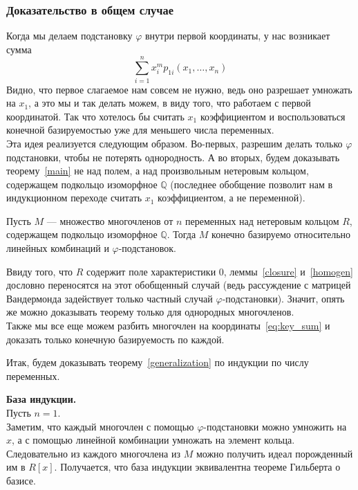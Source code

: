\subsubsection{Доказательство в общем случае}
Когда мы делаем подстановку $\varphi$ внутри первой координаты, у нас возникает сумма
\[\sum\limits_{i=1}^n x_i^m p_{1i}(x_1,\ldots,x_n)\]
Видно, что первое слагаемое нам совсем не нужно, ведь оно разрешает умножать на $x_1$, а это мы и так делать можем, в виду того, что работаем с первой координатой.
Так что хотелось бы считать $x_1$ коэффициентом и воспользоваться конечной базируемостью уже для меньшего числа переменных.\\
Эта идея реализуется следующим образом.
Во-первых, разрешим делать только $\varphi$ подстановки, чтобы не потерять однородность.
А во вторых, будем доказывать теорему~\ref{main} не над полем, а над произвольным нетеровым кольцом, содержащем подкольцо изоморфное $\mathbb{Q}$ (последнее обобщение позволит нам в индукционном переходе считать $x_1$ коэффициентом, а не переменной).\vskip 0.1in\noindent
\begin{theorem}
    \label{generalization}
    Пусть $M$ --- множество многочленов от $n$ переменных над нетеровым кольцом $R$, содержащем подкольцо изоморфное $\mathbb{Q}$.
    Тогда $M$ конечно базируемо относительно линейных комбинаций и $\varphi$-подстановок.
\end{theorem}\vskip 0.1in\noindent
Ввиду того, что $R$ содержит поле характеристики $0$, леммы~\ref{closure} и~\ref{homogen} дословно переносятся на этот обобщенный случай (ведь рассуждение с матрицей Вандермонда задействует только частный случай $\varphi$-подстановки).
Значит, опять же можно доказывать теорему только для однородных многочленов.\\
Также мы все еще можем разбить многочлен на координаты~\ref{eq:key_sum} и доказать только конечную базируемость по каждой.

Итак, будем доказывать теорему~\ref{generalization} по индукции по числу переменных.

\vskip 0.1in\noindent
{\large\textbf{База индукции.}}\\
Пусть $n=1$.\\
Заметим, что каждый многочлен с помощью $\varphi$-подстановки можно умножить на $x$, а с помощью линейной комбинации умножать на элемент кольца.\\
Следовательно из каждого многочлена из $M$ можно получить идеал порожденный им в $R[x]$.
Получается, что база индукции эквивалентна теореме Гильберта о базисе.

